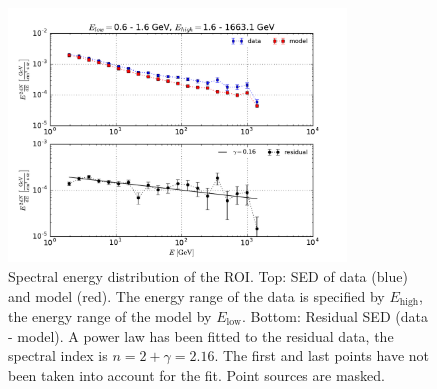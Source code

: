\documentclass[a4paper]{article}
\begin{document}
\begin{figure}[H]
	\centering
	\includegraphics[width=0.8\textwidth]{Res_SED_b=(-2,2)_l=(-10,-4).pdf}
    \caption{Spectral energy distribution of the ROI. Top: SED of data (blue) and model (red). The energy range of the data is specified by $E_\text{high}$, the energy range of the model by $E_\text{low}$. Bottom: Residual SED (data - model). A power law has been fitted to the residual data, the spectral index is $n = 2 + \gamma = 2.16$. The first and last points have not been taken into account for the fit. Point sources are masked.}
    \label{res_SED}
\end{figure}
 
 
 

 
\end{document}
